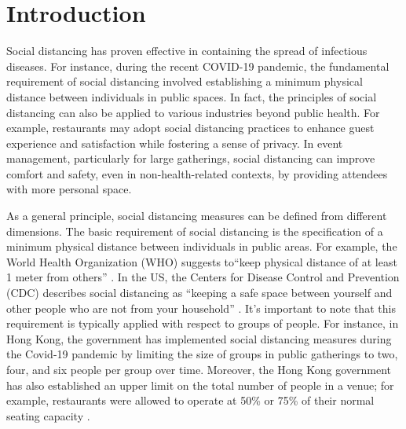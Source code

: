 




\section{Introduction}
Social distancing has proven effective in containing the spread of infectious diseases. For instance, during the recent COVID-19 pandemic, the fundamental requirement of social distancing involved establishing a minimum physical distance between individuals in public spaces. In fact, the principles of social distancing can also be applied to various industries beyond public health.
For example, restaurants may adopt social distancing practices to enhance guest experience and satisfaction while fostering a sense of privacy. In event management, particularly for large gatherings, social distancing can improve comfort and safety, even in non-health-related contexts, by providing attendees with more personal space.


As a general principle, social distancing measures can be defined from different dimensions. The basic requirement of social distancing is the specification of a minimum physical distance between individuals in public areas. For example, the World Health Organization (WHO) suggests to``keep physical distance of at least 1 meter from others'' \citep{AdviceforPublic}. In the US, the Centers for Disease Control and Prevention (CDC) describes social distancing as ``keeping a safe space between yourself and other people who are not from your household'' \citep{CDC}. 
It's important to note that this requirement is typically applied with respect to groups of people. For instance, in Hong Kong, the government has implemented social distancing measures during the Covid-19 pandemic by limiting the size of groups in public gatherings to two, four, and six people per group over time. Moreover, the Hong Kong government has also established an upper limit on the total number of people in a venue; for example, restaurants were allowed to operate at 50\% or 75\% of their normal seating capacity \citep{Gov202003}. 


